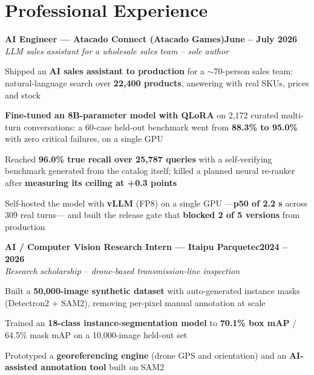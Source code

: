 \documentclass[letterpaper,10pt]{article}
\newcommand{\heading}[2]{
  \hspace{10pt}#1\hfill#2\\
}
\newcommand{\headingBf}[2]{
  \heading{\textbf{#1}}{\textbf{#2}}
}
\newcommand{\headingIt}[2]{
  \heading{\textit{#1}}{\textit{#2}}
}
\newenvironment{resume_list}{
  \vspace{-7pt}
  \begin{itemize}[itemsep=-2px, parsep=1pt, leftmargin=30pt]
}{
  \end{itemize}
}
\begin{document}

  \section{Professional Experience}

  \headingBf{AI Engineer — Atacado Connect (Atacado Games)}{June -- July 2026}
  \headingIt{LLM sales assistant for a wholesale sales team -- sole author}{}
  \begin{resume_list}
    \item Shipped an \textbf{AI sales assistant to production} for a $\sim$70-person sales team: natural-language search over \textbf{22,400 products}, answering with real SKUs, prices and stock
    \item \textbf{Fine-tuned an 8B-parameter model with QLoRA} on 2,172 curated multi-turn conversations: a 60-case held-out benchmark went from \textbf{88.3\% to 95.0\%} with zero critical failures, on a single GPU
    \item Reached \textbf{96.0\% true recall over 25,787 queries} with a self-verifying benchmark generated from the catalog itself; killed a planned neural re-ranker after \textbf{measuring its ceiling at +0.3 points}
    \item Self-hosted the model with \textbf{vLLM} (FP8) on a single GPU —\textbf{p50 of 2.2 s} across 309 real turns— and built the release gate that \textbf{blocked 2 of 5 versions} from production
  \end{resume_list}

  \headingBf{AI / Computer Vision Research Intern — Itaipu Parquetec}{2024 -- 2026}
  \headingIt{Research scholarship -- drone-based transmission-line inspection}{}
  \begin{resume_list}
    \item Built a \textbf{50,000-image synthetic dataset} with auto-generated instance masks (Detectron2 + SAM2), removing per-pixel manual annotation at scale
    \item Trained an \textbf{18-class instance-segmentation model} to \textbf{70.1\% box mAP} / 64.5\% mask mAP on a 10,000-image held-out set
    \item Prototyped a \textbf{georeferencing engine} (drone GPS and orientation) and an \textbf{AI-assisted annotation tool} built on SAM2
  \end{resume_list}

\end{document}
